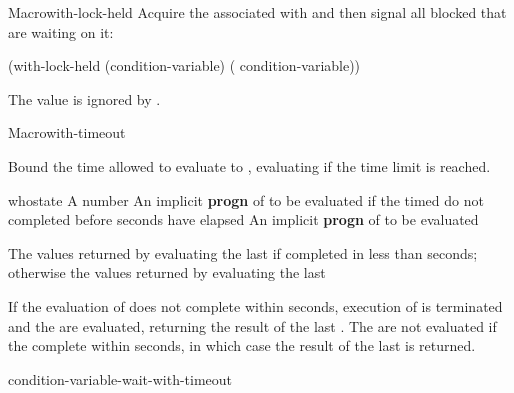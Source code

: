 \documentclass[10pt,twoside,english,pdftex]{article}
\begin{document}
\begin{functiondoc}{Macro}{with-lock-held}{\code{(} 
    \code{)}
    \superstar{} 
    \returns{} \superstar}
%
Acquire the  associated with  and then
signal all blocked  that are waiting on it:
\begin{example}
  (with-lock-held (condition-variable)
    ( condition-variable))
\end{example}

\fnnotes The  value is ignored by
.

\end{functiondoc}


\begin{functiondoc}{Macro}{with-timeout}{\code{(} 
    \superstar{}\code{)}
    \superstar{} 
    \returns{} \superstar}
\fnsyntax

\fnpurpose Bound the time allowed to evaluate  to
, evaluating  if the time limit is reached.

\fnpackage {}

\fnmodule {}

\fnargs
\begin{args}{whostate}
\arg[seconds] A number
 An implicit \textbf{progn} of  to be
evaluated if the timed  do not completed before 
seconds have elapsed
\arg[forms] An implicit \textbf{progn} of  to be evaluated
\end{args}

\fnreturns The values returned by evaluating the last  if
completed in less than  seconds; otherwise the values returned by
evaluating the last 

\fnerrors
\nothreads{}

\fndescription If the evaluation of  does not complete within
 seconds, execution of  is terminated and the
 are evaluated, returning the result of the last
. The  are not evaluated if the
 complete within  seconds, in which case the result of the
last  is returned.

\begin{alsos}{condition-variable-wait-with-timeout}
\end{alsos}


\end{functiondoc}
\end{document}
